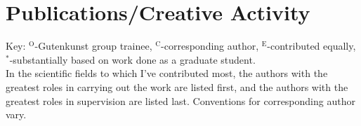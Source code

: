 \documentclass[11pt]{article}
\begin{document}
\newenvironment{hanglist}[1][\parindent]{%
    \begin{list}{}{%
        \setlength{\leftmargin}{#1}
        \setlength{\labelwidth}{0pt}
        \setlength{\labelsep}{0pt}
        \setlength{\itemindent}{-#1}
        \setlength{\topsep}{0pt}
        \setlength{\partopsep}{0pt}
        \setlength{\parsep}{0pt}
        \setlength{\itemsep}{0pt}}
    }{%
        \end{list}
    }

    
\newcommand{\trainee}{$^\mathrm{O}$}
\newcommand{\corresponding}{$^\mathrm{C}$\xspace}
\newcommand{\equal}{$^\mathrm{E}$}
\newcommand{\grad}{$^*$}

\section*{Publications/Creative Activity}
Key: \trainee-Gutenkunst group trainee, \corresponding-corresponding author, \equal-contributed equally,  \grad-substantially based on work done as a graduate student.\\
In the scientific fields to which I've contributed most, the authors with the greatest roles in carrying out the work are listed first, and the authors with the greatest roles in supervision are listed last. Conventions for corresponding author vary.
\end{document}
